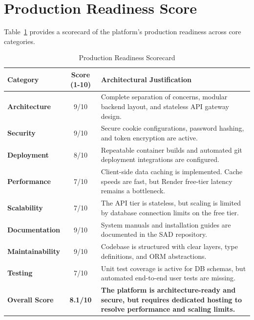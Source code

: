 \pagebreak
\section{Production Readiness Score}
Table~\ref{tab:readiness_scorecard} provides a scorecard of the platform's production readiness across core categories.

\begin{table}[h!]
\centering
\small
\renewcommand{\arraystretch}{1.4}
\begin{tabularx}{\textwidth}{l c X}
    \toprule[1.5pt]
    \rowcolor{primary!5}
    \textbf{\color{primary}Category} & \textbf{\color{primary}Score (1-10)} & \textbf{\color{primary}Architectural Justification} \\
    \midrule
    \textbf{Architecture} & 9/10 & Complete separation of concerns, modular backend layout, and stateless API gateway design. \\
    \textbf{Security}     & 9/10 & Secure cookie configurations, password hashing, and token encryption are active. \\
    \textbf{Deployment}   & 8/10 & Repeatable container builds and automated git deployment integrations are configured. \\
    \textbf{Performance}  & 7/10 & Client-side data caching is implemented. Cache speeds are fast, but Render free-tier latency remains a bottleneck. \\
    \textbf{Scalability}  & 7/10 & The API tier is stateless, but scaling is limited by database connection limits on the free tier. \\
    \textbf{Documentation}& 9/10 & System manuals and installation guides are documented in the SAD repository. \\
    \textbf{Maintainability}& 9/10 & Codebase is structured with clear layers, type definitions, and ORM abstractions. \\
    \textbf{Testing}      & 7/10 & Unit test coverage is active for DB schemas, but automated end-to-end user tests are missing. \\
    \midrule
    \textbf{Overall Score} & \textbf{8.1/10} & \textbf{The platform is architecture-ready and secure, but requires dedicated hosting to resolve performance and scaling limits.} \\
    \bottomrule[1.5pt]
\end{tabularx}
\caption{Production Readiness Scorecard}
\label{tab:readiness_scorecard}
\end{table}

